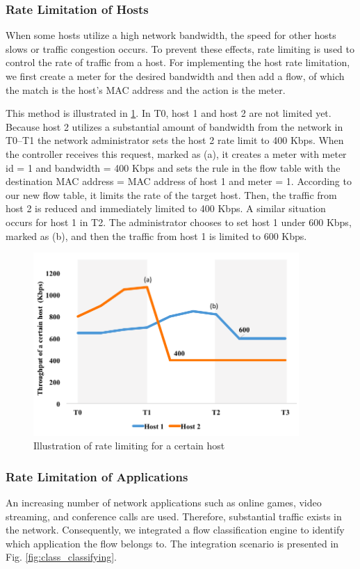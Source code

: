 \subsubsection{Rate Limitation of Hosts}
When some hosts utilize a high network bandwidth, the speed for other hosts slows or traffic congestion occurs. To prevent these effects, rate limiting is used to control the rate of traffic from a host. For implementing the host rate limitation, we first create a meter for the desired bandwidth and then add a flow, of which the match is the host’s MAC address and the action is the meter.

This method is illustrated in \ref{fig:mft_qos_rate_host}. In T0, host 1 and host 2 are not limited yet. Because host 2 utilizes a substantial amount of bandwidth from the network in T0–T1  the network administrator sets the host 2 rate limit to 400 Kbps. When the controller receives this request, marked as (a), it creates a meter with meter id = 1 and bandwidth = 400 Kbps and sets the rule in the flow table with the destination MAC address = MAC address of host 1 and meter = 1. According to our new flow table, it limits the rate of the target host. Then, the traffic from host 2 is reduced and immediately limited to 400 Kbps. A similar situation occurs for host 1 in T2. The administrator chooses to set host 1 under 600 Kbps, marked as (b), and then the traffic from host 1 is limited to 600 Kbps.

\begin{figure}[!t]
\centering
\includegraphics[width=0.9\textwidth]{./fig/mft_qos_rate_host}
\caption{Illustration of rate limiting for a certain host}
\label{fig:mft_qos_rate_host}
\end{figure}

\subsubsection{Rate Limitation of Applications}
An increasing number of network applications such as online games, video streaming, and conference calls are used. Therefore, substantial traffic exists in the network. Consequently, we integrated a flow classification engine to identify which application the flow belongs to. The integration scenario is presented in Fig. \ref{fig:class_classifying}.

